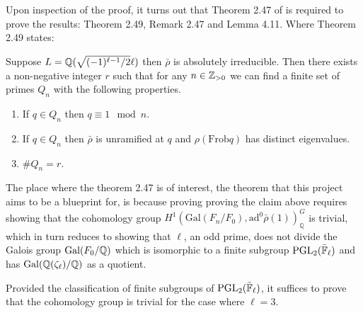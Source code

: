 Upon inspection of the proof, it turns out that Theorem 2.47 of \cite{dtt} is required to prove the results: Theorem 2.49, Remark 2.47 and Lemma 4.11. Where Theorem 2.49 states:

\begin{theorem}[Theorem 2.49]
    Suppose $L = \mathbb{Q}(\sqrt{(-1)^{\ell -1}/2} \ell)$ then $\bar{\rho}$ is absolutely irreducible. Then
    there exists a non-negative integer $r$ such that for any $n \in \mathbb{Z}_{>0}$ we can find a
    finite set of primes $Q_n$ with the following properties.
    \begin{enumerate}
        \item If $q \in Q_n$ then $q \equiv 1 \mod n$.
        \item If $q \in Q_n$ then $\bar{\rho}$ is unramified at $q$ and $\rho(\textrm{Frob}q)$ has distinct eigenvalues.
        \item $\# Q_n = r$.
    \end{enumerate}
\end{theorem}

The place where the theorem 2.47 is of interest, the theorem that this project aims to be a blueprint for, is because proving proving the claim above requires showing that the 
cohomology group  $H^1(\textrm{Gal}(F_n / F_0), \textrm{ad}^0\bar{\rho}(1))^G_{\mathbb{Q}}$ is trivial, which in turn reduces to showing that $\ell$, an odd prime, does not divide the Galois group $\operatorname{Gal}(F_0 /\mathbb{Q})$ which is isomorphic to a finite subgroup $\operatorname{PGL}_2(\bar{\mathbb{F}}_\ell)$
and has $\operatorname{Gal}(\mathbb{Q}(\zeta_\ell)/\mathbb{Q})$ as a quotient.

Provided the classification of finite subgroups of $\operatorname{PGL}_2(\bar{\mathbb{F}}_\ell)$, it suffices to prove that the cohomology group is trivial for the case where $\ell = 3$.




    
